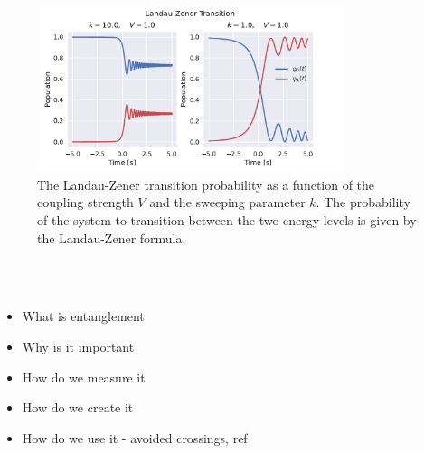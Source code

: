 \documentclass{subfiles}
\begin{document}
\begin{figure}[h!]
    \centering
    \includegraphics[width=0.8\textwidth]{figs/landau_zener.pdf}
    \caption{The Landau-Zener transition probability as a function of the coupling strength $V$ and the sweeping parameter $k$. The probability of the system to transition between the two energy levels is given by the Landau-Zener formula.}
    \label{fig:landau_zener}
\end{figure} 

\\ \\

\begin{itemize}
    \item What is entanglement
    \item Why is it important
    \item How do we measure it
    \item How do we create it
    \item How do we use it - avoided crossings, ref \cite{nazir2005anticrossings}
\end{itemize}
\end{document}
